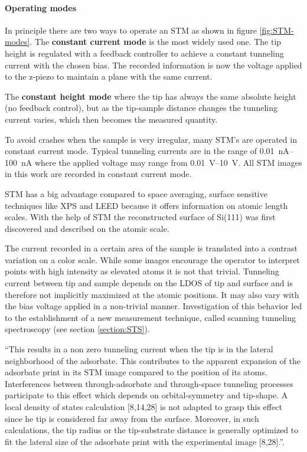 \paragraph{Operating modes}
In principle there are two ways to operate an STM as shown in figure \ref{fig:STM-modes}.
The \textbf{constant current mode} is the most widely used one. The tip height is regulated with a feedback controller to achieve a constant tunneling current with the chosen bias. The recorded information is now the voltage applied to the z-piezo to maintain a plane with the same current.

The \textbf{constant height mode} where the tip has always the same absolute height (no feedback control), but as the tip-sample distance changes the tunneling current varies, which then becomes the measured quantity.

To avoid crashes when the sample is very irregular, many STM's are operated in constant current mode. Typical tunneling currents are in the range of \SIrange{0.01}{100}{\nA} where the applied voltage may range from \SIrange{0.01}{10}{\volt}. All STM images in this work are recorded in constant current mode.

STM has a big advantage compared to space averaging, surface sensitive techniques like XPS and LEED because it offers information on atomic length scales. With the help of STM the reconstructed surface of Si(111) was first discovered \cite{binnig_1983} and described on the atomic scale.

The current recorded in a certain area of the sample is translated into a contrast variation on a color scale. While some images encourage the operator to interpret points with high intensity as elevated atoms it is not that trivial. Tunneling current between tip and sample depends on the LDOS of tip and surface and is therefore not implicitly maximized at the atomic positions. It may also vary with the bias voltage applied in a non-trivial manner. Investigation of this behavior led to the establishment of a new measurement technique, called scanning tunneling spectroscopy (see section \ref{section:STS}). 

``This results in a non zero tunneling current when the tip is in the lateral neighborhood of the adsorbate. This contributes to the apparent expansion of the adsorbate print in its STM image compared to the position of its atoms. Interferences between through-adsorbate and through-space tunneling processes participate to this effect which depends on orbital-symmetry and tip-shape. A local density of states calculation [8,14,28] is not adapted to grasp this effect since he tip is considered far away from the surface. Moreover, in such calculations, the tip radius or the tip-substrate distance is generally optimized to fit the lateral size of the adsorbate print with the experimental image [8,28].''\cite{sautet_interpretation_1992}.

